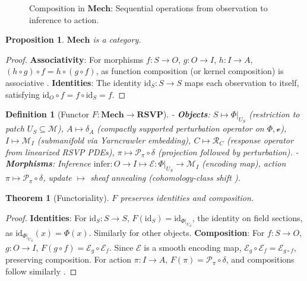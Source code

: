 \documentclass{article}
\newtheorem{theorem}{Theorem}
\newtheorem{proposition}{Proposition}
\newtheorem{definition}{Definition}
\begin{document}
\begin{figure}[h]
\centering
{}
\caption{Composition in $\mathbf{Mech}$: Sequential operations from observation to inference to action.}
\label{fig:mech_composition}
\end{figure}

\begin{proposition}
$\mathbf{Mech}$ is a category.
\end{proposition}
\begin{proof}
\textbf{Associativity}: For morphisms $f: S \to O$, $g: O \to I$, $h: I \to A$, $(h \circ g) \circ f = h \circ (g \circ f)$, as function composition (or kernel composition) is associative \cite{Lawvere2009}. \textbf{Identities}: The identity $\text{id}_S: S \to S$ maps each observation to itself, satisfying $\text{id}_O \circ f = f \circ \text{id}_S = f$.
\end{proof}

\begin{definition}[Functor $F: \mathbf{Mech} \to \mathbf{RSVP}$]
- \textbf{Objects}: $S \mapsto \Phi|_{U_S}$ (restriction to patch $U_S \subseteq \mathcal{M}$), $A \mapsto \delta_A$ (compactly supported perturbation operator on $\Phi, \mathcal{v}$), $I \mapsto \mathcal{M}_I$ (submanifold via Yarncrawler embedding), $C \mapsto \mathcal{R}_C$ (response operator from linearized RSVP PDEs), $\pi \mapsto \mathcal{P}_\pi \circ \delta$ (projection followed by perturbation).
- \textbf{Morphisms}: Inference $\text{infer}: O \to I \mapsto \mathcal{E}: \Phi|_{U_S} \to \mathcal{M}_I$ (encoding map), action $\pi \mapsto \mathcal{P}_\pi \circ \delta$, update $\mapsto$ sheaf annealing (cohomology-class shift \cite{MacLane1992}).
\end{definition}

\begin{theorem}[Functoriality]
$F$ preserves identities and composition.
\end{theorem}
\begin{proof}
\textbf{Identities}: For $\text{id}_S: S \to S$, $F(\text{id}_S) = \text{id}_{\Phi|_{U_S}}$, the identity on field sections, as $\text{id}_{\Phi|_{U_S}}(x) = \Phi(x)$. Similarly for other objects. \textbf{Composition}: For $f: S \to O$, $g: O \to I$, $F(g \circ f) = \mathcal{E}_g \circ \mathcal{E}_f$. Since $\mathcal{E}$ is a smooth encoding map, $\mathcal{E}_g \circ \mathcal{E}_f = \mathcal{E}_{g \circ f}$, preserving composition. For action $\pi: I \to A$, $F(\pi) = \mathcal{P}_\pi \circ \delta$, and compositions follow similarly \cite{Spivak2014}.
\end{proof}
\end{document}
